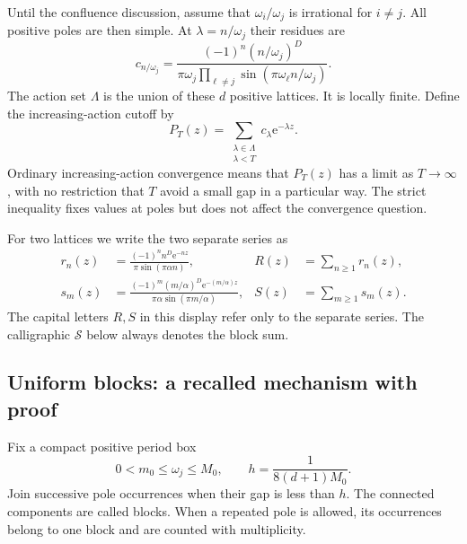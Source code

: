 \documentclass[11pt,a4paper]{article}
\numberwithin{equation}{section}
\theoremstyle{definition}
\theoremstyle{remark}
\newcommand{\e}{\mathrm e}
\newcommand{\Ssum}{\mathcal S}
\begin{document}
Until the confluence discussion, assume that $\omega_i/\omega_j$ is irrational
for $i\ne j$. All positive poles are then simple. At
$\lambda=n/\omega_j$ their residues are
\begin{equation}
 c_{n/\omega_j}
 =\frac{(-1)^n(n/\omega_j)^D}
 {\pi\omega_j\prod_{\ell\ne j}\sin(\pi\omega_\ell n/\omega_j)}.
 \label{eq:residue-general}
\end{equation}
The action set $\Lambda$ is the union of these $d$ positive lattices.
It is locally finite. Define the increasing-action cutoff by
\begin{equation}
 P_T(z)=\sum_{\substack{\lambda\in\Lambda\\\lambda<T}}
                    c_\lambda\e^{-\lambda z}.
 \label{eq:raw-cutoff}
\end{equation}
Ordinary increasing-action convergence means that $P_T(z)$ has a limit
as $T\to\infty$, with no restriction that $T$ avoid a small gap in a
particular way. The strict inequality fixes values at poles but does
not affect the convergence question.

For two lattices we write the two separate series as
\begin{align}
 r_n(z)&=\frac{(-1)^n n^D\e^{-nz}}{\pi\sin(\pi\alpha n)},
 &R(z)&=\sum_{n\ge1}r_n(z),\label{eq:two-r}\\
 s_m(z)&=\frac{(-1)^m(m/\alpha)^D\e^{-(m/\alpha)z}}
                  {\pi\alpha\sin(\pi m/\alpha)},
 &S(z)&=\sum_{m\ge1}s_m(z).
 \label{eq:two-s}
\end{align}
The capital letters $R,S$ in this display refer only to the separate
series. The calligraphic $\Ssum$ below always denotes the block sum.

\subsection{Uniform blocks: a recalled mechanism with proof}
Fix a compact positive period box
\begin{equation}
 0<m_0\le\omega_j\le M_0,\qquad
 h=\frac{1}{8(d+1)M_0}.
 \label{eq:box}
\end{equation}
Join successive pole occurrences when their gap is less than $h$.
The connected components are called blocks. When a repeated pole is
allowed, its occurrences belong to one block and are counted with
multiplicity.
\end{document}
